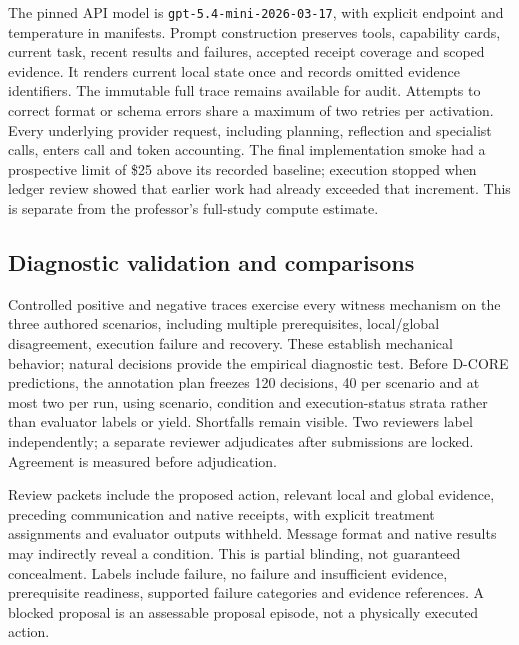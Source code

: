 \documentclass[sigconf,anonymous]{aamas}
\begin{document}
The pinned API model is \texttt{gpt-5.4-mini-}\allowbreak\texttt{2026-03-17}, with explicit endpoint and temperature in manifests. Prompt construction preserves tools, capability cards, current task, recent results and failures, accepted receipt coverage and scoped evidence. It renders current local state once and records omitted evidence identifiers. The immutable full trace remains available for audit. Attempts to correct format or schema errors share a maximum of two retries per activation. Every underlying provider request, including planning, reflection and specialist calls, enters call and token accounting. The final implementation smoke had a prospective limit of \$25 above its recorded baseline; execution stopped when ledger review showed that earlier work had already exceeded that increment. This is separate from the professor's full-study compute estimate.

\subsection{Diagnostic validation and comparisons}
Controlled positive and negative traces exercise every witness mechanism on the three authored scenarios, including multiple prerequisites, local/global disagreement, execution failure and recovery. These establish mechanical behavior; natural decisions provide the empirical diagnostic test. Before D-CORE predictions, the annotation plan freezes 120 decisions, 40 per scenario and at most two per run, using scenario, condition and execution-status strata rather than evaluator labels or yield. Shortfalls remain visible. Two reviewers label independently; a separate reviewer adjudicates after submissions are locked. Agreement is measured before adjudication.

Review packets include the proposed action, relevant local and global evidence, preceding communication and native receipts, with explicit treatment assignments and evaluator outputs withheld. Message format and native results may indirectly reveal a condition. This is partial blinding, not guaranteed concealment. Labels include failure, no failure and insufficient evidence, prerequisite readiness, supported failure categories and evidence references. A blocked proposal is an assessable proposal episode, not a physically executed action.
\end{document}
